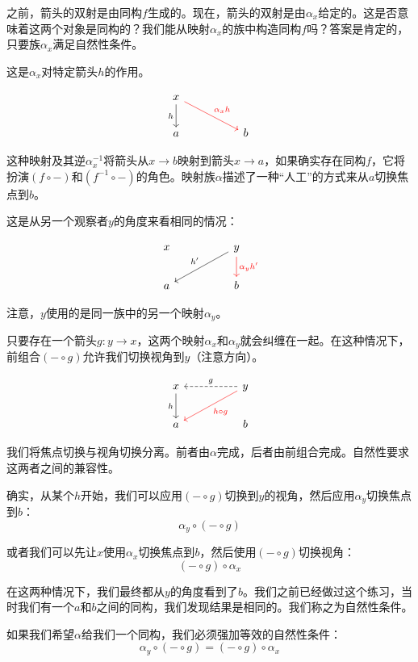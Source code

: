 \documentclass[DaoFP]{subfiles}
\begin{document}
 之前，箭头的双射是由同构$f$生成的。现在，箭头的双射是由$\alpha_x$给定的。这是否意味着这两个对象是同构的？我们能从映射$\alpha_x$的族中构造同构$f$吗？答案是肯定的，只要族$\alpha_x$满足自然性条件。

 这是$\alpha_x$对特定箭头$h$的作用。

 \[
  \begin{tikzcd}
   x
   \arrow[d, "h"']
   \arrow[rrd, red, "\alpha_x h"]
   \\
   a
   && b
  \end{tikzcd}
 \]

 这种映射及其逆$\alpha^{-1}_x$将箭头从$x \to b$映射到箭头$x \to a$，如果确实存在同构$f$，它将扮演$(f \circ -)$和$(f^{-1} \circ -)$的角色。映射族$\alpha$描述了一种“人工”的方式来从$a$切换焦点到$b$。

 这是从另一个观察者$y$的角度来看相同的情况：

 \[
  \begin{tikzcd}
   x
   && y
   \arrow[lld, "h'"']
   \arrow[d, red, "\alpha_y h'"]
   \\
   a
   && b
  \end{tikzcd}
 \]

 注意，$y$使用的是同一族中的另一个映射$\alpha_y$。

 只要存在一个箭头$g \colon y \to x$，这两个映射$\alpha_x$和$\alpha_y$就会纠缠在一起。在这种情况下，前组合$(- \circ g)$允许我们切换视角到$y$（注意方向）。

 \[
  \begin{tikzcd}
   x
   \arrow[d, "h"']
   && y
   \arrow[ll, dashed, "g"']
   \arrow[lld, red, "h \circ g"]
   \\
   a
   && b
  \end{tikzcd}
 \]

 我们将焦点切换与视角切换分离。前者由$\alpha$完成，后者由前组合完成。自然性要求这两者之间的兼容性。

 确实，从某个$h$开始，我们可以应用$(- \circ g)$切换到$y$的视角，然后应用$\alpha_y$切换焦点到$b$：
 \[ \alpha_y \circ (- \circ g) \]

 或者我们可以先让$x$使用$\alpha_x$切换焦点到$b$，然后使用$(- \circ g)$切换视角：
 \[ (- \circ g) \circ \alpha_x \]

 在这两种情况下，我们最终都从$y$的角度看到了$b$。我们之前已经做过这个练习，当时我们有一个$a$和$b$之间的同构，我们发现结果是相同的。我们称之为自然性条件。

 如果我们希望$\alpha$给我们一个同构，我们必须强加等效的自然性条件：
 \[ \alpha_y \circ (- \circ g) = (- \circ g) \circ \alpha_x \]
\end{document}

